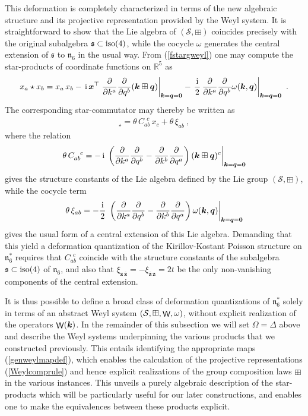 \documentclass[11pt,a4paper]{article}
\DeclareMathOperator{\weyl}{{\sf W}}                   %
\newcommand{\comp}{\boxplus}                            %
\newcommand{\ii}{{\rm i}}
\newcommand{\mbf}[1]{{\boldsymbol {#1} }}
\def\ii{{\,{\rm i}\,}}
\def\mz{{\mbf z}}
\def\mx{{\mbf x}}
\def\mk{{\mbf k}}
\def\mq{{\mbf q}}
\def\mfn{{\mathfrak n}}
\def\mfs{{\mathfrak s}}
\def\mcS{{\mathcal S}}
\newcommand{\real}{{\mathbb R}} %
\def\d{\partial}
\newcommand{\beq}{\begin{eqnarray}}
\newcommand{\eeq}{\end{eqnarray}}
\begin{document}
This deformation is completely characterized in terms of the
new algebraic structure and its projective representation provided by
the Weyl system. It is straightforward to show
that the Lie algebra of $(\mathcal{S},\comp)$ coincides precisely with
the original subalgebra $\mfs\subset{\rm iso}(4)$, while the cocycle $\omega$
generates the central extension of $\mfs$ to $\mfn_6$ in the
usual way. From (\ref{fstargweyl}) one may compute the
star-products of coordinate functions on $\real^5$ as
\beq
x_a\star x_b=x_a\,x_b-\ii\mx^\top\left.\frac\d{\d k^a}\frac\d
{\d q^b}(\mk\comp\mq)\right|_{\mk=\mq=\mbf0}-\left.\frac\ii2\,
\frac\d{\d k^a}\frac\d
{\d q^b}\omega(\mk,\mq)\right|_{\mk=\mq=\mbf0} \ .
\label{xastarxbweyl}\eeq
The corresponding star-commutator may thereby be written as
\beq
[x_a,x_b]_\star=\theta\,C_{ab}^{~~c}\,x_c+\theta\,\xi_{ab} \ ,
\label{xaxbstarcommxi}\eeq
where the relation
\beq
\theta\,C_{ab}^{~~c}=-\ii\left.\left(\frac\d{\d k^a}\frac\d
{\d q^b}-\frac\d{\d k^b}\frac\d
{\d q^a}\right)(\mk\comp\mq)^c\right|_{\mk=\mq=\mbf0}
\label{Cabccomp}\eeq
gives the structure constants of the Lie algebra defined by the Lie
group $(\mathcal{S},\comp)$, while the cocycle term
\beq
\theta\,\xi_{ab}=-\frac\ii2\,\left.\left(\frac\d{\d k^a}\frac\d
{\d q^b}-\frac\d{\d k^b}\frac\d
{\d q^a}\right)\omega(\mk,\mq)\right|_{\mk=\mq=\mbf0}
\label{cocycleterm}\eeq
gives the usual form of a central extension of this Lie
algebra. Demanding that this yield a deformation quantization of the
Kirillov-Kostant Poisson structure on $\mfn_6^*$ requires that
$C_{ab}^{~~c}$ coincide with the structure constants of the subalgebra
$\mfs\subset{\rm iso}(4)$ of $\mfn_6$, and also that
$\xi_{\mz\,\overline{\mz}}=-\xi_{\overline{\mz}\,\mz}=2t$ be the only
non-vanishing components of the central extension.

It is thus possible to define a broad class of deformation quantizations of
$\mfn_6^*$ solely in terms of an abstract Weyl system
$(\mcS,\comp,\weyl,\omega)$, without explicit realization of the
operators $\weyl(\mk)$. In the remainder of this subsection we will
set $\Omega=\Delta$ above and describe the Weyl systems
underpinning the various products that we constructed previously. This
entails identifying the appropriate maps (\ref{genweylmapdef}), which
enables the calculation of the projective representations
(\ref{Weylcomprule}) and hence explicit realizations of the group
composition laws $\comp$ in the various instances. This unveils a
purely algebraic description of the star-products which will be
particularly useful for our later constructions, and enables one to
make the equivalences between these products explicit.
\end{document}
